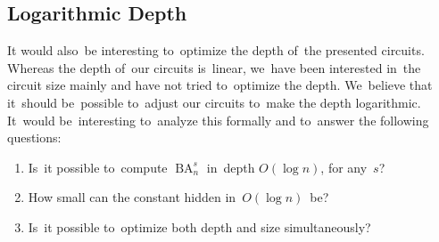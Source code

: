 \documentclass[sigconf, review, anonymous]{acmart}
\DeclareMathOperator{\BA}{BA}
\begin{document}
\subsection{Logarithmic Depth}
It would also~be interesting to~optimize the depth of~the presented circuits.
Whereas the depth of~our circuits is~linear,
we~have been interested in~the circuit size mainly and
have not tried to~optimize the depth. We~believe that it~should be~possible
to~adjust our circuits to~make the depth logarithmic. It~would be~interesting
to~analyze this formally and to~answer the following questions:
\begin{enumerate}
	\item Is~it possible to~compute $\BA_n^s$ in~depth $O(\log n)$, for any~$s$?
	\item How small can the constant hidden in~$O(\log n)$~be?
	\item Is~it possible to~optimize both depth and size simultaneously?
\end{enumerate}




\end{document}
